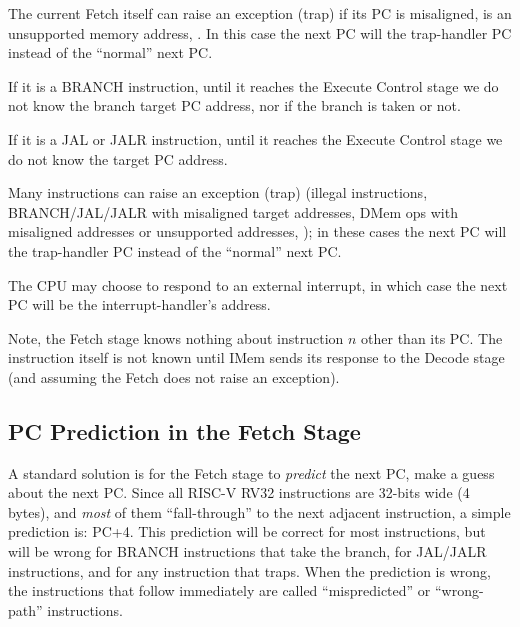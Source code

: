 \begin{tightlist}

 \item The current Fetch itself can raise an exception (trap) if its
        PC is misaligned, is an unsupported memory address, {\etc}.
        In this case the next PC will the trap-handler PC instead of
        the ``normal'' next PC.

 \item If it is a BRANCH instruction, until it reaches the Execute
       Control stage we do not know the branch target PC address, nor
       if the branch is taken or not.

 \item If it is a JAL or JALR instruction, until it reaches the
       Execute Control stage we do not know the target PC address.

 \item Many instructions can raise an exception (trap) (illegal
       instructions, BRANCH/JAL/JALR with misaligned target addresses,
       DMem ops with misaligned addresses or unsupported addresses,
       {\etc}); in these cases the next PC will the trap-handler PC
       instead of the ``normal'' next PC.

 \item The CPU may choose to respond to an external interrupt, in
        which case the next PC will be the interrupt-handler's
        address.

\end{tightlist}

Note, the Fetch stage knows nothing about instruction $n$ other than
its PC.  The instruction itself is not known until IMem sends its
response to the Decode stage (and assuming the Fetch does not raise an
exception).


\subsection{PC Prediction in the Fetch Stage}


A standard solution is for the Fetch stage to \emph{predict} the next
PC, {\ie} make a guess about the next PC.  Since all RISC-V RV32
instructions are 32-bits wide (4 bytes), and \emph{most} of them
``fall-through'' to the next adjacent instruction, a simple prediction
is: PC+4.  This prediction will be correct for most instructions, but
will be wrong for BRANCH instructions that take the branch, for
JAL/JALR instructions, and for any instruction that traps.  When the
prediction is wrong, the instructions that follow immediately are
called ``mispredicted'' or ``wrong-path'' instructions.

